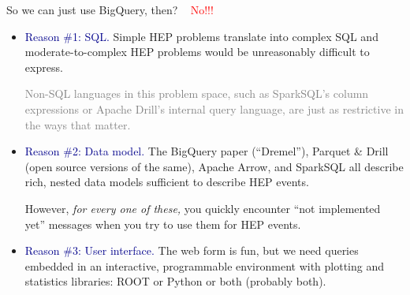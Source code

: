 \documentclass[aspectratio=169]{beamer}
\begin{document}
\begin{frame}{So we can just use BigQuery, then?}
\vspace{0.25 cm}
\mbox{ } \hfill \textcolor{red}{\Huge No!!!} \hfill \mbox{ }

\vspace{0.1 cm}
\begin{itemize}\setlength{\itemsep}{0.2 cm}
\item<2-> \textcolor{darkblue}{Reason \#1: SQL.} Simple HEP problems translate into complex SQL and moderate-to-complex HEP problems would be unreasonably difficult to express.

\vspace{0.15 cm}
\textcolor{gray}{Non-SQL languages in this problem space, such as SparkSQL's column expressions or Apache Drill's internal query language, are just as restrictive in the ways that matter.}

\item<3-> \textcolor{darkblue}{Reason \#2: Data model.} The BigQuery paper (``Dremel''), Parquet \& Drill (open source versions of the same), Apache Arrow, and SparkSQL all describe rich, nested data models sufficient to describe HEP events.

\vspace{0.15 cm}
However, {\it for every one of these,} you quickly encounter ``not implemented yet'' messages when you try to use them for HEP events.

\item<4-> \textcolor{darkblue}{Reason \#3: User interface.} The web form is fun, but we need queries embedded in an interactive, programmable environment with plotting and statistics libraries: ROOT or Python or both (probably both).
\end{itemize}
\end{frame}
\end{document}
